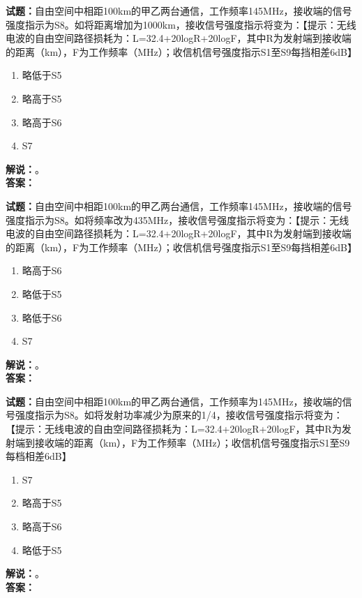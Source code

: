 \documentclass{ctexbook}
\begin{document}
\bigskip

\noindent\textbf{试题：}自由空间中相距100km的甲乙两台通信，工作频率145\unit{\MHz}，接收端的信号强度指示为S8。如将距离增加为1000km，接收信号强度指示将变为：【提示：无线电波的自由空间路径损耗为：L=32.4+20logR+20logF，其中R为发射端到接收端的距离（km），F为工作频率（\unit{\MHz}）；收信机信号强度指示S1至S9每挡相差6dB】
\begin{enumerate}[leftmargin=3em]
  \item 略低于S5
  \item 略高于S5
  \item 略高于S6
  \item S7
\end{enumerate}
\noindent\textbf{解说：}\textbf{}。\\\noindent\textbf{答案：}

\bigskip

\noindent\textbf{试题：}自由空间中相距100km的甲乙两台通信，工作频率145\unit{\MHz}，接收端的信号强度指示为S8。如将频率改为435\unit{\MHz}，接收信号强度指示将变为：【提示：无线电波的自由空间路径损耗为：L=32.4+20logR+20logF，其中R为发射端到接收端的距离（km），F为工作频率（\unit{\MHz}）；收信机信号强度指示S1至S9每挡相差6dB】
\begin{enumerate}[leftmargin=3em]
  \item 略高于S6
  \item 略低于S5
  \item 略低于S6
  \item S7
\end{enumerate}
\noindent\textbf{解说：}\textbf{}。\\\noindent\textbf{答案：}

\bigskip

\noindent\textbf{试题：}自由空间中相距100km的甲乙两台通信，工作频率为145\unit{\MHz}，接收端的信号强度指示为S8。如将发射功率减少为原来的1/4，接收信号强度指示将变为：【提示：无线电波的自由空间路径损耗为：L=32.4+20logR+20logF，其中R为发射端到接收端的距离（km），F为工作频率（\unit{\MHz}）；收信机信号强度指示S1至S9每档相差6dB】
\begin{enumerate}[leftmargin=3em]
  \item S7
  \item 略高于S5
  \item 略高于S6
  \item 略低于S5
\end{enumerate}
\noindent\textbf{解说：}\textbf{}。\\\noindent\textbf{答案：}

\bigskip
\end{document}
